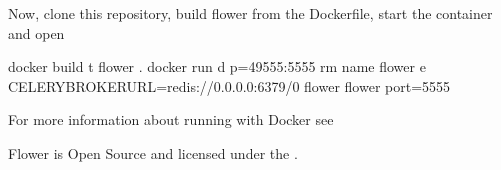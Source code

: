 \documentclass[letterpaper,10pt,english]{sphinxmanual}
\begin{document}
Now, clone this repository, build flower from the Dockerfile, start the
container and open 

\begin{sphinxVerbatim}[commandchars=\\\{\}]
\PYGZdl{} docker build \PYGZhy{}t \PYGZdq{}flower\PYGZdq{} .
\PYGZdl{} docker run \PYGZhy{}d \PYGZhy{}p=49555:5555 \PYGZhy{}\PYGZhy{}rm \PYGZhy{}\PYGZhy{}name flower \PYGZhy{}e CELERY\PYGZus{}BROKER\PYGZus{}URL=redis://0.0.0.0:6379/0 flower flower \PYGZhy{}\PYGZhy{}port=5555
\end{sphinxVerbatim}

For more information about running with Docker see

Flower is Open Source and licensed under the .
\end{document}
